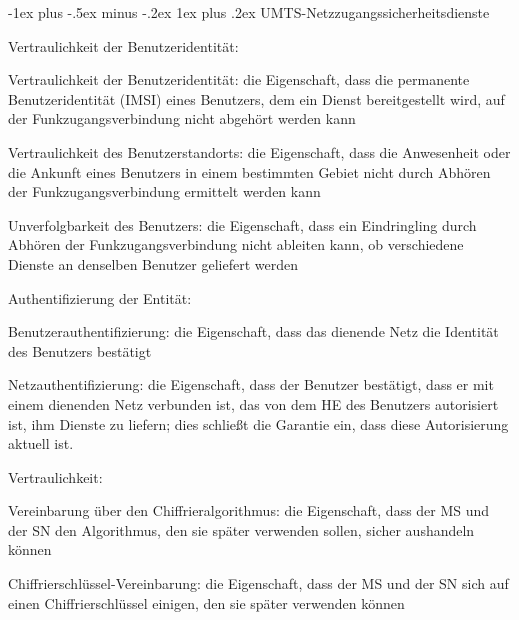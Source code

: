 \documentclass[a4paper]{article}
\makeatletter
\renewcommand{\subsubsection}{\@startsection{subsubsection}{3}{0mm}%
 {-1ex plus -.5ex minus -.2ex}%
 {1ex plus .2ex}%
 {\normalfont\small\bfseries}}
\makeatother
\begin{document}
\begin{multicols}{3}
      \subsubsection{UMTS-Netzzugangssicherheitsdienste}
      \begin{itemize*}
            \item Vertraulichkeit der Benutzeridentität:
            \begin{itemize*}
                  \item Vertraulichkeit der Benutzeridentität: die Eigenschaft, dass die permanente Benutzeridentität (IMSI) eines Benutzers, dem ein Dienst bereitgestellt wird, auf der Funkzugangsverbindung nicht abgehört werden kann
                  \item Vertraulichkeit des Benutzerstandorts: die Eigenschaft, dass die Anwesenheit oder die Ankunft eines Benutzers in einem bestimmten Gebiet nicht durch Abhören der Funkzugangsverbindung ermittelt werden kann
                  \item Unverfolgbarkeit des Benutzers: die Eigenschaft, dass ein Eindringling durch Abhören der Funkzugangsverbindung nicht ableiten kann, ob verschiedene Dienste an denselben Benutzer geliefert werden
            \end{itemize*}
            \item Authentifizierung der Entität:
            \begin{itemize*}
                  \item Benutzerauthentifizierung: die Eigenschaft, dass das dienende Netz die Identität des Benutzers bestätigt
                  \item Netzauthentifizierung: die Eigenschaft, dass der Benutzer bestätigt, dass er mit einem dienenden Netz verbunden ist, das von dem HE des Benutzers autorisiert ist, ihm Dienste zu liefern; dies schließt die Garantie ein, dass diese Autorisierung aktuell ist.
            \end{itemize*}
            \item Vertraulichkeit:
            \begin{itemize*}
                  \item Vereinbarung über den Chiffrieralgorithmus: die Eigenschaft, dass der MS und der SN den Algorithmus, den sie später verwenden sollen, sicher aushandeln können
                  \item Chiffrierschlüssel-Vereinbarung: die Eigenschaft, dass der MS und der SN sich auf einen Chiffrierschlüssel einigen, den sie später verwenden können

\end{itemize*}
\end{itemize*}
\end{multicols}
\end{document}
